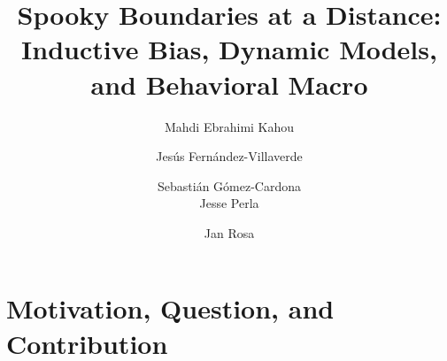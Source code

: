 \documentclass[aspectratio=169,10pt]{beamer}
\begin{document}
\title{{\vspace{0.4in}\hspace{0.2in}\textcolor{KahouBlack}{Spooky Boundaries at a Distance: \\ \hspace*{5 mm}Inductive Bias, Dynamic Models, and Behavioral Macro}}}
\author{\hspace*{4 mm} Mahdi Ebrahimi Kahou\and
	Jes\'{u}s Fern\'{a}ndez-Villaverde \and Sebasti\'an G\'omez-Cardona \\ \hspace*{4 mm}  Jesse Perla \and Jan Rosa}



\date{}

\maketitle

\section{\textcolor{KahouBlack}{Motivation, Question, and Contribution}}
\end{document}
